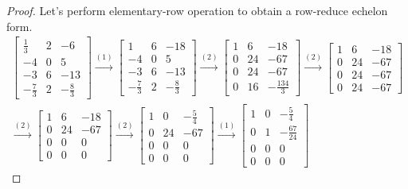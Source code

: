 \begin{proof}
    Let's perform elementary-row operation to obtain a row-reduce echelon form.
    \begingroup{}
    \allowdisplaybreaks{}
    \begin{align*}
        \begin{bmatrix}
            \frac{1}{3}  & 2 & -6           \\
            -4           & 0 & 5            \\
            -3           & 6 & -13          \\
            -\frac{7}{3} & 2 & -\frac{8}{3}
        \end{bmatrix}
        \stackrel{(1)}{\rightarrow}
        \begin{bmatrix}
            1            & 6 & -18          \\
            -4           & 0 & 5            \\
            -3           & 6 & -13          \\
            -\frac{7}{3} & 2 & -\frac{8}{3}
        \end{bmatrix}
        \stackrel{(2)}{\rightarrow}
        \begin{bmatrix}
            1 & 6  & -18            \\
            0 & 24 & -67            \\
            0 & 24 & -67            \\
            0 & 16 & -\frac{134}{3}
        \end{bmatrix}
        \stackrel{(2)}{\rightarrow}
        \begin{bmatrix}
            1 & 6  & -18 \\
            0 & 24 & -67 \\
            0 & 24 & -67 \\
            0 & 24 & -67
        \end{bmatrix} \\
        \stackrel{(2)}{\rightarrow}
        \begin{bmatrix}
            1 & 6  & -18 \\
            0 & 24 & -67 \\
            0 & 0  & 0   \\
            0 & 0  & 0
        \end{bmatrix}
        \stackrel{(2)}{\rightarrow}
        \begin{bmatrix}
            1 & 0  & -\frac{5}{4} \\
            0 & 24 & -67          \\
            0 & 0  & 0            \\
            0 & 0  & 0
        \end{bmatrix}
        \stackrel{(1)}{\rightarrow}
        \begin{bmatrix}
            1 & 0 & -\frac{5}{4}   \\
            0 & 1 & -\frac{67}{24} \\
            0 & 0 & 0              \\
            0 & 0 & 0
        \end{bmatrix}
    \end{align*}
    \endgroup{}


\end{proof}
